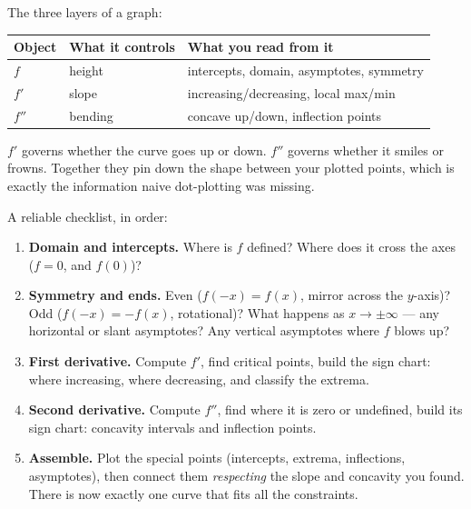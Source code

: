 \begin{focusbox}
The three layers of a graph:
\begin{center}
\begin{tabular}{lll}
\toprule
\textbf{Object} & \textbf{What it controls} & \textbf{What you read from it}\\
\midrule
$f$ & height & intercepts, domain, asymptotes, symmetry\\
$f'$ & slope & increasing/decreasing, local max/min\\
$f''$ & bending & concave up/down, inflection points\\
\bottomrule
\end{tabular}
\end{center}
$f'$ governs whether the curve goes up or down. $f''$ governs whether it smiles or
frowns. Together they pin down the shape between your plotted points, which is
exactly the information naive dot-plotting was missing.
\end{focusbox}

A reliable checklist, in order:

\begin{enumerate}
\item \textbf{Domain and intercepts.} Where is $f$ defined? Where does it cross the
axes ($f=0$, and $f(0)$)?
\item \textbf{Symmetry and ends.} Even ($f(-x)=f(x)$, mirror across the $y$-axis)?
Odd ($f(-x)=-f(x)$, rotational)? What happens as $x\to\pm\infty$ --- any horizontal
or slant asymptotes? Any vertical asymptotes where $f$ blows up?
\item \textbf{First derivative.} Compute $f'$, find critical points, build the sign
chart: where increasing, where decreasing, and classify the extrema.
\item \textbf{Second derivative.} Compute $f''$, find where it is zero or
undefined, build its sign chart: concavity intervals and inflection points.
\item \textbf{Assemble.} Plot the special points (intercepts, extrema,
inflections, asymptotes), then connect them \emph{respecting} the slope and
concavity you found. There is now exactly one curve that fits all the constraints.
\end{enumerate}

